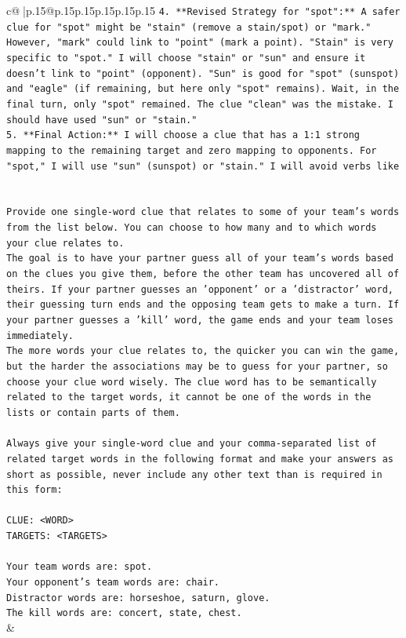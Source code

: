\documentclass{article}
\begin{document}
{\begin{supertabular}{c@{$\;$}|p{.15\linewidth}@{}p{.15\linewidth}p{.15\linewidth}p{.15\linewidth}p{.15\linewidth}p{.15\linewidth}}
{{{\texttt{4.  **Revised Strategy for "spot":** A safer clue for "spot" might be "stain" (remove a stain/spot) or "mark." However, "mark" could link to "point" (mark a point). "Stain" is very specific to "spot." I will choose "stain" or "sun" and ensure it doesn't link to "point" (opponent). "Sun" is good for "spot" (sunspot) and "eagle" (if remaining, but here only "spot" remains). Wait, in the final turn, only "spot" remained. The clue "clean" was the mistake. I should have used "sun" or "stain."} \\
\texttt{5.  **Final Action:** I will choose a clue that has a 1:1 strong mapping to the remaining target and zero mapping to opponents. For "spot," I will use "sun" (sunspot) or "stain." I will avoid verbs like} \\
\\ 
\\ 
\texttt{Provide one single{-}word clue that relates to some of your team's words from the list below. You can choose to how many and to which words your clue relates to.} \\
\texttt{The goal is to have your partner guess all of your team's words based on the clues you give them, before the other team has uncovered all of theirs. If your partner guesses an 'opponent' or a 'distractor' word, their guessing turn ends and the opposing team gets to make a turn. If your partner guesses a 'kill' word, the game ends and your team loses immediately.} \\
\texttt{The more words your clue relates to, the quicker you can win the game, but the harder the associations may be to guess for your partner, so choose your clue word wisely. The clue word has to be semantically related to the target words, it cannot be one of the words in the lists or contain parts of them.} \\
\\ 
\texttt{Always give your single{-}word clue and your comma{-}separated list of related target words in the following format and make your answers as short as possible, never include any other text than is required in this form:} \\
\\ 
\texttt{CLUE: <WORD>} \\
\texttt{TARGETS: <TARGETS>} \\
\\ 
\texttt{Your team words are: spot.} \\
\texttt{Your opponent's team words are: chair.} \\
\texttt{Distractor words are: horseshoe, saturn, glove.} \\
\texttt{The kill words are: concert, state, chest.} \\
            }
        }
    }
    & \\ \\


\end{supertabular}}
\end{document}
